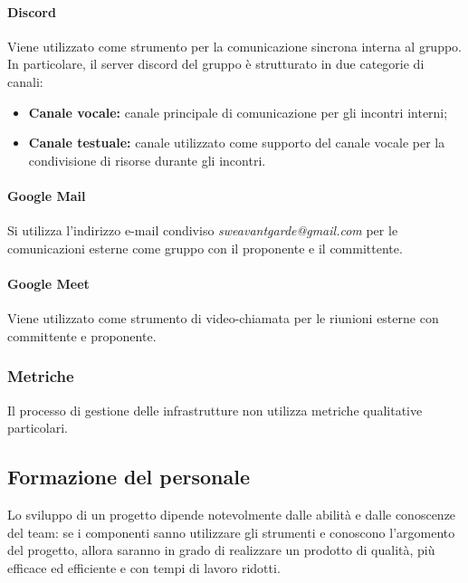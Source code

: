 \paragraph{Discord}
Viene utilizzato come strumento per la comunicazione sincrona interna al gruppo. In particolare, il server discord del gruppo è strutturato in due categorie di canali:
\begin{itemize}
    \item \textbf{Canale vocale:} canale principale di comunicazione per gli incontri interni;
    \item \textbf{Canale testuale:} canale utilizzato come supporto del canale vocale per la condivisione di risorse durante gli incontri.
\end{itemize}

\paragraph{Google Mail}
Si utilizza l’indirizzo e-mail condiviso \textit{sweavantgarde@gmail.com} per le comunicazioni esterne come gruppo con il proponente e il committente.

\paragraph{Google Meet}
Viene utilizzato come strumento di video-chiamata per le riunioni esterne con committente e proponente.

\subsubsection{Metriche}\label{sec:processi_organizzativi:gestione_infrastrutture:metriche}
Il processo di gestione delle infrastrutture non utilizza metriche qualitative particolari.

\subsection{Formazione del personale}\label{sec:processi_organizzativi:formazione_personale}
Lo sviluppo di un progetto dipende notevolmente dalle abilità e dalle conoscenze del team: se i componenti sanno utilizzare gli strumenti e conoscono l'argomento del progetto, allora saranno in grado di realizzare un prodotto di qualità, più efficace ed efficiente e con tempi di lavoro ridotti.
